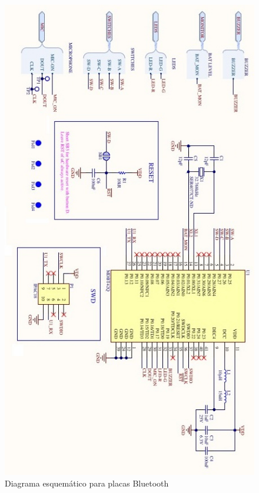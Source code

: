 \begin{figure}[htpb]
	\centering
	\includegraphics[scale=1]{./Figures/esquematico2.jpeg}
	\caption{Diagrama esquemático para placas Bluetooth}
	\label{fig:esquematico}
\end{figure}


